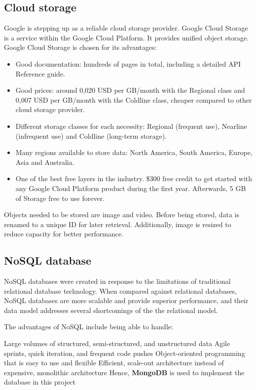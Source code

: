 \subsection{Cloud storage}
Google is stepping up as a reliable cloud storage provider. Google Cloud Storage is a service within the Google Cloud Platform. It provides unified object storage. 
Google Cloud Storage is chosen for its advantages:
\begin{itemize}
\item Good documentation: hundreds of pages in total, including a detailed API Reference guide.
\item Good prices: around 0,020 USD per GB/month with the Regional class and 0,007 USD per GB/month with the Coldline class, cheaper compared to other cloud storage provider.
\item Different storage classes for each necessity: Regional (frequent use), Nearline (infrequent use) and Coldline (long-term storage).
\item Many regions available to store data: North America, South America, Europe, Asia and Australia.
\item One of the best free layers in the industry. \$300 free credit to get started with any Google Cloud Platform product during the first year. Afterwards, 5 GB of Storage free to use forever.
\end{itemize}
Objects needed to be stored are image and video. Before being stored, data is renamed to a unique ID for later retrieval. Additionally, image is resized to reduce capacity for better performance.
\subsection{NoSQL database}
NoSQL databases were created in response to the limitations of traditional relational database technology. When compared against relational databases, NoSQL databases are more scalable and provide superior performance, and their data model addresses several shortcomings of the the relational model.

The advantages of NoSQL include being able to handle:

Large volumes of structured, semi-structured, and unstructured data
Agile sprints, quick iteration, and frequent code pushes
Object-oriented programming that is easy to use and flexible
Efficient, scale-out architecture instead of expensive, monolithic architecture
Hence, \textbf{MongoDB} is used to implement the database in this project
